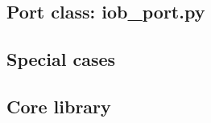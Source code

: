 \documentclass{ug}
\begin{document}
\subsection{Port class: iob\_port.py}
\label{sec:iob_port}


\subsection{Special cases}
\label{sec:special_cases}




% 

\subsection{Core library}
\label{sec:core_lib}


% 
% 
% 
\end{document}
